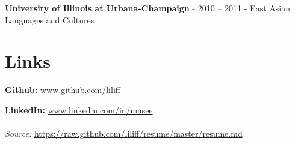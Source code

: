 \documentclass{article}
\begin{document}
\textbf{University of Illinois at Urbana-Champaign} - 2010 -- 2011 - East Asian Languages and Cultures
\section{Links}

\textbf{Github:} \url{www.github.com/liliff}\par
\textbf{LinkedIn:} \url{www.linkedin.com/in/musee}
\\
\\
\textsl{Source:} \url{https://raw.github.com/liliff/resume/master/resume.md}
\end{document}
